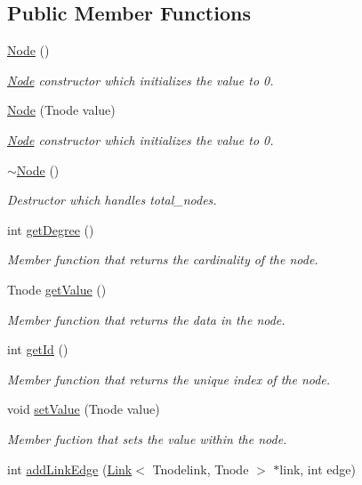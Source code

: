 \subsection*{Public Member Functions}
\begin{DoxyCompactItemize}
\item 
\hyperlink{classNode_a93fa08e2d8c63f93e3cc9ab8202e3334}{Node} ()
\begin{DoxyCompactList}\small\item\em \hyperlink{classNode}{Node} constructor which initializes the value to 0. \end{DoxyCompactList}\item 
\hyperlink{classNode_a5e6d51ef5b0456c3fd48b8196baebea5}{Node} (Tnode value)
\begin{DoxyCompactList}\small\item\em \hyperlink{classNode}{Node} constructor which initializes the value to 0. \end{DoxyCompactList}\item 
\hyperlink{classNode_a3bc7885a7623bde95ddd068d13c91af3}{$\sim$\-Node} ()
\begin{DoxyCompactList}\small\item\em Destructor which handles total\-\_\-nodes. \end{DoxyCompactList}\item 
int \hyperlink{classNode_a58fa0d9e8d2099bb0afd533d8ae55d12}{get\-Degree} ()
\begin{DoxyCompactList}\small\item\em Member function that returns the cardinality of the node. \end{DoxyCompactList}\item 
Tnode \hyperlink{classNode_aa9067e2137ecc75ddd802d5a574612f1}{get\-Value} ()
\begin{DoxyCompactList}\small\item\em Member function that returns the data in the node. \end{DoxyCompactList}\item 
int \hyperlink{classNode_a91639d810acda39b666715b07b5c2100}{get\-Id} ()
\begin{DoxyCompactList}\small\item\em Member function that returns the unique index of the node. \end{DoxyCompactList}\item 
void \hyperlink{classNode_a39ea9f0c2d3af467734b5c78a001bbcb}{set\-Value} (Tnode value)
\begin{DoxyCompactList}\small\item\em Member fuction that sets the value within the node. \end{DoxyCompactList}\item 
\hypertarget{classNode_a669f230accdef7328ef0c217c63b0dd4}{int \hyperlink{classNode_a669f230accdef7328ef0c217c63b0dd4}{add\-Link\-Edge} (\hyperlink{classLink}{Link}$<$ Tnodelink, Tnode $>$ $\ast$link, int edge)}\label{classNode_a669f230accdef7328ef0c217c63b0dd4}


\end{DoxyCompactItemize}
